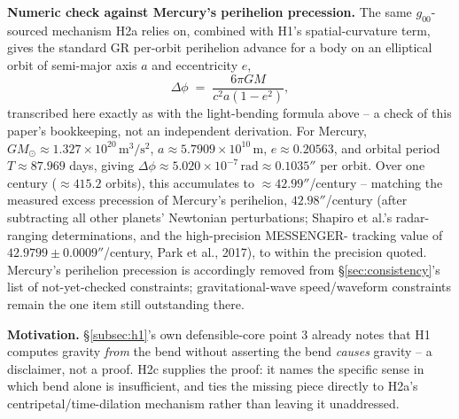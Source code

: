 \documentclass[12pt, a4paper]{article}
\begin{document}
\textbf{Numeric check against Mercury's perihelion precession.} The
same $g_{00}$-sourced mechanism H2a relies on, combined with H1's
spatial-curvature term, gives the standard GR per-orbit perihelion
advance for a body on an elliptical orbit of semi-major axis $a$ and
eccentricity $e$,
\begin{equation}
\Delta\phi \;=\; \frac{6\pi GM}{c^2 a(1-e^2)},
\end{equation}
transcribed here exactly as with the light-bending formula above --
a check of this paper's bookkeeping, not an independent derivation.
For Mercury, $GM_\odot\approx1.327\times10^{20}\,\mathrm{m^3/s^2}$,
$a\approx5.7909\times10^{10}\,\mathrm{m}$, $e\approx0.20563$, and
orbital period $T\approx87.969$ days, giving
$\Delta\phi\approx5.020\times10^{-7}\,\mathrm{rad}\approx0.1035''$
per orbit. Over one century ($\approx415.2$ orbits), this accumulates
to $\approx42.99''$/century -- matching the measured excess
precession of Mercury's perihelion, $42.98''$/century (after
subtracting all other planets' Newtonian perturbations; Shapiro et
al.'s radar-ranging determinations, and the high-precision MESSENGER-
tracking value of $42.9799\pm0.0009''$/century, Park et al., 2017),
to within the precision quoted. Mercury's perihelion precession is
accordingly removed from \S\ref{sec:consistency}'s list of
not-yet-checked constraints; gravitational-wave speed/waveform
constraints remain the one item still outstanding there.

\textbf{Motivation.} \S\ref{subsec:h1}'s own defensible-core point 3
already notes that H1 computes gravity \emph{from} the bend without
asserting the bend \emph{causes} gravity -- a disclaimer, not a proof.
H2c supplies the proof: it names the specific sense in which bend
alone is insufficient, and ties the missing piece directly to H2a's
centripetal/time-dilation mechanism rather than leaving it
unaddressed.
\end{document}

